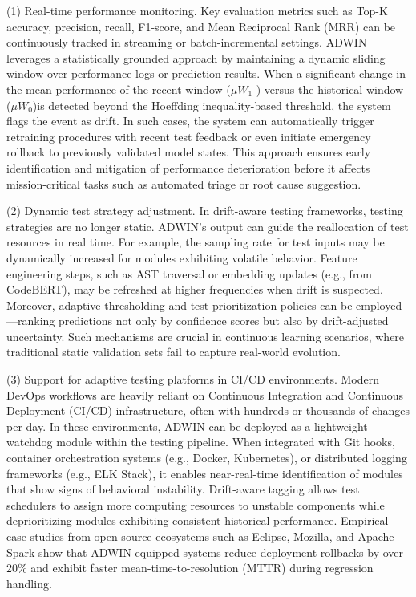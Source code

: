 \documentclass[manuscript,screen,review]{acmart}
\begin{document}
(1) Real-time performance monitoring.
Key evaluation metrics such as Top-K accuracy, precision, recall, F1-score, and Mean Reciprocal Rank (MRR) can be continuously tracked in streaming or batch-incremental settings. ADWIN leverages a statistically grounded approach by maintaining a dynamic sliding window over performance logs or prediction results. When a significant change in the mean performance of the recent window (\( \mu\)\( W_1 \) ) versus the historical window (\( \mu\)\( W_0 \))is detected beyond the Hoeffding inequality-based threshold, the system flags the event as drift. In such cases, the system can automatically trigger retraining procedures with recent test feedback or even initiate emergency rollback to previously validated model states. This approach ensures early identification and mitigation of performance deterioration before it affects mission-critical tasks such as automated triage or root cause suggestion.

(2) Dynamic test strategy adjustment.
In drift-aware testing frameworks, testing strategies are no longer static. ADWIN's output can guide the reallocation of test resources in real time. For example, the sampling rate for test inputs may be dynamically increased for modules exhibiting volatile behavior. Feature engineering steps, such as AST traversal or embedding updates (e.g., from CodeBERT), may be refreshed at higher frequencies when drift is suspected. Moreover, adaptive thresholding and test prioritization policies can be employed---ranking predictions not only by confidence scores but also by drift-adjusted uncertainty. Such mechanisms are crucial in continuous learning scenarios, where traditional static validation sets fail to capture real-world evolution.

(3) Support for adaptive testing platforms in CI/CD environments.
Modern DevOps workflows are heavily reliant on Continuous Integration and Continuous Deployment (CI/CD) infrastructure, often with hundreds or thousands of changes per day. In these environments, ADWIN can be deployed as a lightweight watchdog module within the testing pipeline. When integrated with Git hooks, container orchestration systems (e.g., Docker, Kubernetes), or distributed logging frameworks (e.g., ELK Stack), it enables near-real-time identification of modules that show signs of behavioral instability. Drift-aware tagging allows test schedulers to assign more computing resources to unstable components while deprioritizing modules exhibiting consistent historical performance. Empirical case studies from open-source ecosystems such as Eclipse, Mozilla, and Apache Spark show that ADWIN-equipped systems reduce deployment rollbacks by over 20\% and exhibit faster mean-time-to-resolution (MTTR) during regression handling.
\end{document}
